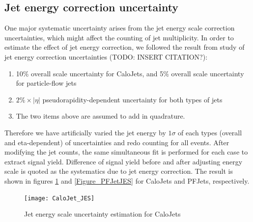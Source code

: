 \documentclass{cmspaper}
\begin{document}

\subsection{Jet energy correction uncertainty}

One major systematic uncertainty arises from the jet energy scale correction uncertainties, which might affect the counting of jet multiplicity.
In order to estimate the effect of jet energy correction, we followed the result from study of jet energy correction uncertainties (TODO: INSERT CITATION?):

\begin{enumerate}
\item 10\% overall scale uncertainty for CaloJets, and 5\% overall scale uncertainty for particle-flow jets
\item $2\% \times |\eta|$ pseudorapidity-dependent uncertainty for both types of jets
\item The two items above are assumed to add in quadrature.
\end{enumerate}

Therefore we have artificially varied the jet energy by $1 \sigma$ of each types (overall and eta-dependent) of uncertainties and redo counting for all events.
After modifying the jet counts, the same simultaneous fit is performed for each case to extract signal yield.
Difference of signal yield before and after adjusting energy scale is quoted as the systematics due to jet energy correction.
The result is shown in figures \ref{Figure_CaloJetJES} and \ref{Figure_PFJetJES} for CaloJets and PFJets, respectively.

\begin{figure}[hbtp]
\begin{center}
\texttt{[image: CaloJet\_JES]}
\caption{Jet energy scale uncertainty estimation for CaloJets}
\label{Figure_CaloJetJES}
\end{center}
\end{figure}
\end{document}
